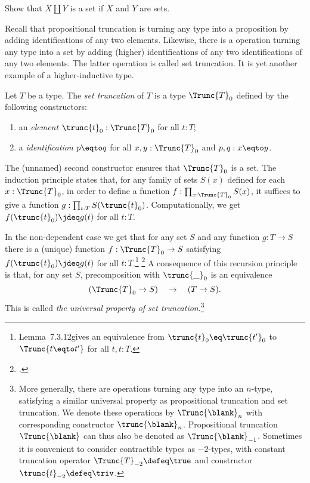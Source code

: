 \begin{xca}\label{xca:set-sum}
Show that $X\amalg Y$ is a set if $X$ and $Y$ are sets.
\end{xca}

Recall that propositional truncation is turning any type into
a proposition by adding identifications of any two elements.
Likewise, there is a operation turning any type into a set
by adding (higher) identifications of any two identifications
of any two elements. The latter operation is called set truncation.
It is yet another example of a higher-inductive type.

\begin{definition}\label{def:set-truncation}
Let $T$ be a type. The \emph{set truncation} of $T$
is a type  $\Trunc{T}_0$ defined by the following constructors:
\begin{enumerate}
\item an \emph{element} $\trunc{t}_0 : \Trunc{T}_0$ for all $t:T$;
\item a \emph{identification} $p \eqto q$ for all $x,y:\Trunc{T}_0$ and $p,q: x \eqto y$.
\end{enumerate}
The (unnamed) second constructor ensures that $\Trunc{T}_0$ is a
set. The induction principle states that,
for any family of sets $S(x)$ defined for each $x:\Trunc{T}_0$,
in order to define a function $f:\prod_{x:\Trunc{T}_0} S(x)$,
it suffices to give a function $g: \prod_{t:T} S(\trunc{t}_0)$.
Computationally, we get $f(\trunc{t}_0)\jdeq g(t)$ for all $t:T$.
\end{definition}

In the non-dependent case we get that for any set $S$ and
any function $g: T\to S$ there is a (unique) function $f:\Trunc{T}_0\to S$
satisfying $f(\trunc{t}_0)\jdeq g(t)$ for all $t:T$.\footnote{%
Lemma~7.3.12\footnotemark gives an equivalence from
$\trunc{t}_0 \eq \trunc{t'}_0$ to $\Trunc{t \eqto t'}$ for all $t,t:T$.}%
\footcitetext{hottbook}
A consequence of this recursion principle is that,
for any set $S$, precomposition with $\trunc{\_}_0$ is an equivalence
\[
(\Trunc{T}_0 \to S) \quad \to \quad (T \to S).
\]
This is called \emph{the universal property of set truncation}.\footnote{%
More generally, there are operations turning any type into an $n$-type,
satisfying a similar universal property as propositional truncation
and set truncation. We denote these operations
by $\Trunc{\blank}_n$ with corresponding constructor $\trunc{\blank}_n$.
Propositional truncation $\Trunc{\blank}$ can thus also be denoted as
$\Trunc{\blank}_{-1}$. Sometimes it is convenient to consider
contractible types as $-2$-types, with constant truncation operator
$\Trunc{T}_{-2}\defeq\true$ and
constructor $\trunc{t}_{-2}\defeq\triv$.
}%

